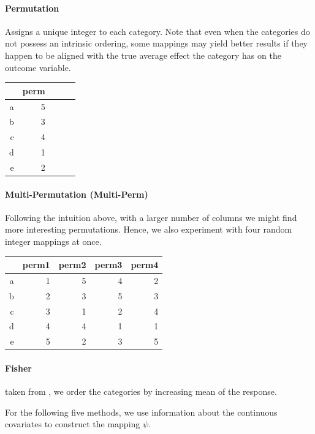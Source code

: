 \documentclass{article}
\theoremstyle{plain}
\theoremstyle{definition}
\theoremstyle{remark}
\begin{document}
\paragraph{Permutation} Assigns a unique integer to each category. Note that even when the categories do not possess an intrinsic ordering, some mappings may yield better results if they happen to be aligned with the true average effect the category has on the outcome variable.


\begin{table}[H]
	\centering
	\begin{tabular}{rrrrr}
		\hline
		& perm  \\
		\hline
		a & 5  \\
		b & 3  \\
		c & 4  \\
		d & 1 \\
		e & 2  \\
		\hline
	\end{tabular}
\end{table}



\paragraph{Multi-Permutation (Multi-Perm)} Following the intuition above, with a larger number of columns we might find more interesting permutations. Hence, we also experiment with four random integer mappings at once.

\begin{table}[H]
	\centering
	\begin{tabular}{rrrrr}
		\hline
		& perm1 & perm2 & perm3 & perm4 \\
		\hline
		a & 1 & 5 & 4 & 2 \\
		b & 2 & 3 & 5 & 3 \\
		c & 3 & 1 & 2 & 4 \\
		d & 4 & 4 & 1 & 1 \\
		e & 5 & 2 & 3 & 5 \\
		\hline
	\end{tabular}
\end{table}

\paragraph{Fisher} taken from \cite{hastie2009elements}, we order the categories by increasing mean of the response.

\vspace{.5em}

For the following five methods, we use information about the continuous covariates to construct the mapping $\psi$.



\end{document}
